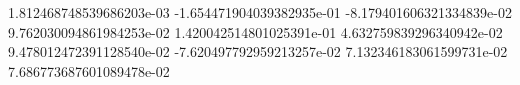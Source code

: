 1.812468748539686203e-03
-1.654471904039382935e-01
-8.179401606321334839e-02
9.762030094861984253e-02
1.420042514801025391e-01
4.632759839296340942e-02
9.478012472391128540e-02
-7.620497792959213257e-02
7.132346183061599731e-02
7.686773687601089478e-02

